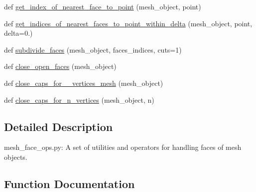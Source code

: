 \begin{DoxyCompactItemize}
\item 
def \hyperlink{namespacemeshy_1_1neuromorphovis_1_1mesh_1_1ops_1_1mesh__face__ops_a08b58a40da73b5c5916cfc3baad09e07}{get\+\_\+index\+\_\+of\+\_\+nearest\+\_\+face\+\_\+to\+\_\+point} (mesh\+\_\+object, point)
\item 
def \hyperlink{namespacemeshy_1_1neuromorphovis_1_1mesh_1_1ops_1_1mesh__face__ops_a185ab5f3ef9c32efda919a7a9db7be5e}{get\+\_\+indices\+\_\+of\+\_\+nearest\+\_\+faces\+\_\+to\+\_\+point\+\_\+within\+\_\+delta} (mesh\+\_\+object, point, delta=0.)
\item 
def \hyperlink{namespacemeshy_1_1neuromorphovis_1_1mesh_1_1ops_1_1mesh__face__ops_a476542d2d1e9ab4319efb42e92908c2d}{subdivide\+\_\+faces} (mesh\+\_\+object, faces\+\_\+indices, cuts=1)
\item 
def \hyperlink{namespacemeshy_1_1neuromorphovis_1_1mesh_1_1ops_1_1mesh__face__ops_a4505ed40b69400b36c2f30e63f899ee2}{close\+\_\+open\+\_\+faces} (mesh\+\_\+object)
\item 
def \hyperlink{namespacemeshy_1_1neuromorphovis_1_1mesh_1_1ops_1_1mesh__face__ops_ad0c2ea169c7726da0ddd75b2942b0fa1}{close\+\_\+caps\+\_\+for\+\_\+\_\+vertices\+\_\+mesh} (mesh\+\_\+object)
\item 
def \hyperlink{namespacemeshy_1_1neuromorphovis_1_1mesh_1_1ops_1_1mesh__face__ops_a5c79f5ffa2e914b6087c9e0ca5f072d7}{close\+\_\+caps\+\_\+for\+\_\+n\+\_\+vertices} (mesh\+\_\+object, n)
\end{DoxyCompactItemize}


\subsection{Detailed Description}
\begin{DoxyVerb}mesh_face_ops.py:
A set of utilities and operators for handling faces of mesh objects.
\end{DoxyVerb}
 

\subsection{Function Documentation}

